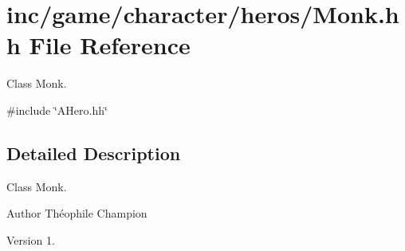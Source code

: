 \hypertarget{Monk_8hh}{}\section{inc/game/character/heros/\+Monk.hh File Reference}
\label{Monk_8hh}


Class Monk.  


{\ttfamily \#include \char`\"{}A\+Hero.\+hh\char`\"{}}\newline


\subsection{Detailed Description}
Class Monk. 

\begin{DoxyAuthor}{Author}
Théophile Champion 
\end{DoxyAuthor}
\begin{DoxyVersion}{Version}
1. 
\end{DoxyVersion}
